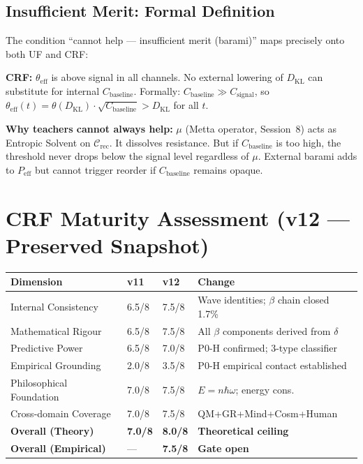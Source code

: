 \documentclass[12pt, a4paper]{article}
\begin{document}
\subsection{Insufficient Merit: Formal Definition}

\begin{derivedbox}[title={Insufficient Merit: $P_{\mathrm{total}} < P_{\mathrm{breakthrough}}$}]
The condition ``cannot help --- insufficient merit (barami)'' maps precisely onto both UF and CRF:

\textbf{CRF:} $\theta_{\mathrm{eff}}$ is above signal in all channels. No external lowering of
$D_{\mathrm{KL}}$ can substitute for internal $C_{\mathrm{baseline}}$.
Formally: $C_{\mathrm{baseline}} \gg C_{\mathrm{signal}}$, so
$\theta_{\mathrm{eff}}(t) = \theta(D_{\mathrm{KL}}) \cdot \sqrt{C_{\mathrm{baseline}}} > D_{\mathrm{KL}}$
for all $t$.

\textbf{Why teachers cannot always help:} $\mu$ (Metta operator, Session~8) acts as
Entropic Solvent on $\mathcal{C}_{\mathrm{rec}}$. It dissolves resistance. But if
$C_{\mathrm{baseline}}$ is too high, the threshold never drops below the signal level
regardless of $\mu$. External barami adds to $P_{\mathrm{eff}}$ but cannot trigger
reorder if $C_{\mathrm{baseline}}$ remains opaque.
\end{derivedbox}

\section{CRF Maturity Assessment (v12 --- Preserved Snapshot)}

\begin{center}
{\footnotesize
\renewcommand{\arraystretch}{1.35}
\begin{tabular}{p{3.8cm} p{1.2cm} p{1.2cm} p{5.5cm}}
\toprule
\textbf{Dimension} & \textbf{v11} & \textbf{v12} & \textbf{Change} \\
\midrule
Internal Consistency & 6.5/8 & 7.5/8 & Wave identities; $\beta$ chain closed 1.7\% \\
Mathematical Rigour & 6.5/8 & 7.5/8 & All $\beta$ components derived from $\delta$ \\
Predictive Power & 6.5/8 & 7.0/8 & P0-H confirmed; 3-type classifier \\
Empirical Grounding & 2.0/8 & 3.5/8 & P0-H empirical contact established \\
Philosophical Foundation & 7.0/8 & 7.5/8 & $E = n\hbar\omega$; energy cons. \\
Cross-domain Coverage & 7.0/8 & 7.5/8 & QM+GR+Mind+Cosm+Human \\
\midrule
\textbf{Overall (Theory)} & \textbf{7.0/8} & \textbf{8.0/8} & \textbf{Theoretical ceiling} \\
\textbf{Overall (Empirical)} & --- & \textbf{7.5/8} & \textbf{Gate open} \\
\bottomrule
\end{tabular}
}
\end{center}
\end{document}
